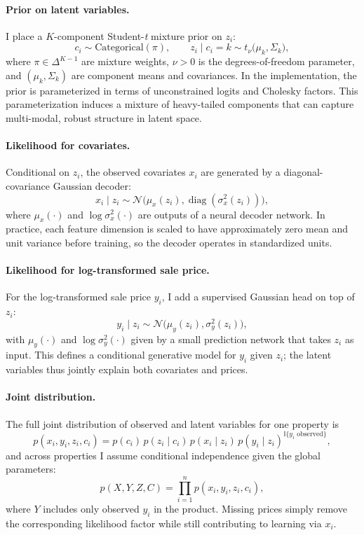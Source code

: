 \documentclass[11pt]{article}
\begin{document}
\paragraph{Prior on latent variables.} I place a $K$-component Student-\emph{t} mixture prior on $z_i$:
\[
c_i \sim \text{Categorical}(\pi), \qquad
z_i \mid c_i = k \sim t_\nu\big(\mu_k, \Sigma_k\big),
\]
where $\pi \in \Delta^{K-1}$ are mixture weights, $\nu > 0$ is the degrees-of-freedom parameter, and $(\mu_k,\Sigma_k)$ are component means and covariances. In the implementation, the prior is parameterized in terms of unconstrained logits and Cholesky factors. This parameterization induces a mixture of heavy-tailed components that can capture multi-modal, robust structure in latent space.

\paragraph{Likelihood for covariates.} Conditional on $z_i$, the observed covariates $x_i$ are generated by a diagonal-covariance Gaussian decoder:
\[
x_i \mid z_i \sim \mathcal{N}\big(\mu_x(z_i), \operatorname{diag}(\sigma^2_x(z_i))\big),
\]
where $\mu_x(\cdot)$ and $\log \sigma_x^2(\cdot)$ are outputs of a neural decoder network. In practice, each feature dimension is scaled to have approximately zero mean and unit variance before training, so the decoder operates in standardized units.

\paragraph{Likelihood for log-transformed sale price.} For the log-transformed sale price $y_i$, I add a supervised Gaussian head on top of $z_i$:
\[
y_i \mid z_i \sim \mathcal{N}\big(\mu_y(z_i), \sigma_y^2(z_i)\big),
\]
with $\mu_y(\cdot)$ and $\log \sigma_y^2(\cdot)$ given by a small prediction network that takes $z_i$ as input. This defines a conditional generative model for $y_i$ given $z_i$; the latent variables thus jointly explain both covariates and prices.

\paragraph{Joint distribution.} The full joint distribution of observed and latent variables for one property is
\[
p(x_i, y_i, z_i, c_i)
= p(c_i)\, p(z_i \mid c_i)\, p(x_i \mid z_i)\, p(y_i \mid z_i)^{\mathbb{I}\{y_i \text{ observed}\}},
\]
and across properties I assume conditional independence given the global parameters:
\[
p(X, Y, Z, C)
= \prod_{i=1}^n p(x_i, y_i, z_i, c_i),
\]
where $Y$ includes only observed $y_i$ in the product. Missing prices simply remove the corresponding likelihood factor while still contributing to learning via $x_i$.
\end{document}
